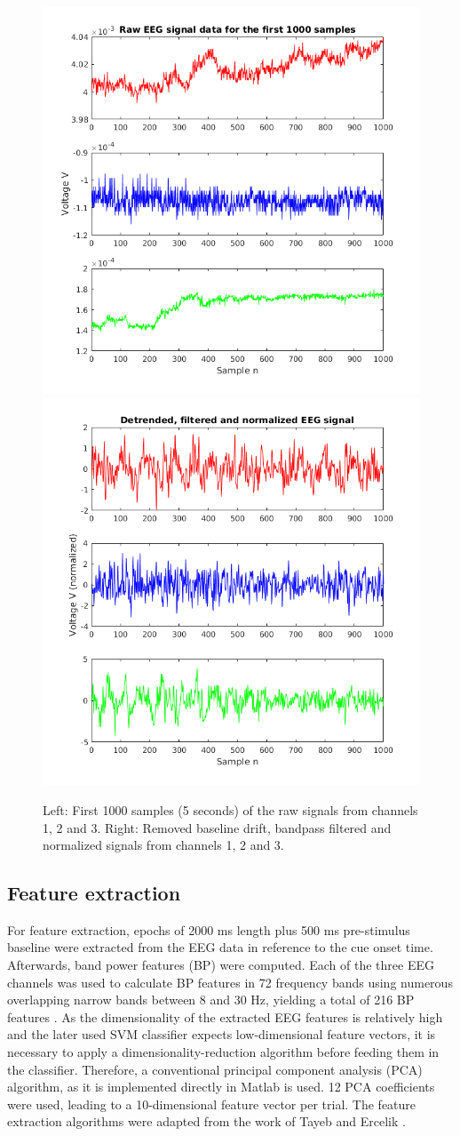 \documentclass[a4paper,oneside, openright,12pt]{report}
\begin{document}
\begin{figure}[htbp!]
	\centering
	\includegraphics[width=0.49\linewidth]{./gfx/raw}
	\includegraphics[width=0.49\linewidth]{./gfx/filtered}
	\caption{Left: First 1000 samples (5 seconds) of the raw signals from channels 1, 2 and 3. Right: Removed baseline drift, bandpass filtered and normalized signals from channels 1, 2 and 3.}
	\label{fig:signals}
\end{figure}

\subsection{Feature extraction}
For feature extraction, epochs of 2000 ms length plus 500 ms pre-stimulus baseline were extracted from the EEG data in reference to the cue onset time. Afterwards, band power features (BP) were computed. Each of the three EEG channels was used to calculate BP features in 72 frequency bands using numerous overlapping narrow bands between 8 and 30 Hz, yielding a total of 216 BP features \cite{leeb2007brain, tayeb2017spinnaker}. As the dimensionality of the extracted EEG features is relatively high and the later used SVM classifier expects low-dimensional feature vectors, it is necessary to apply a dimensionality-reduction algorithm before feeding them in the classifier. Therefore, a conventional principal component analysis (PCA) algorithm, as it is implemented directly in Matlab is used. 12 PCA coefficients were used, leading to a 10-dimensional feature vector per trial. The feature extraction algorithms were adapted from the work of Tayeb and Ercelik \cite{tayeb2017spinnaker}. 
\end{document}
